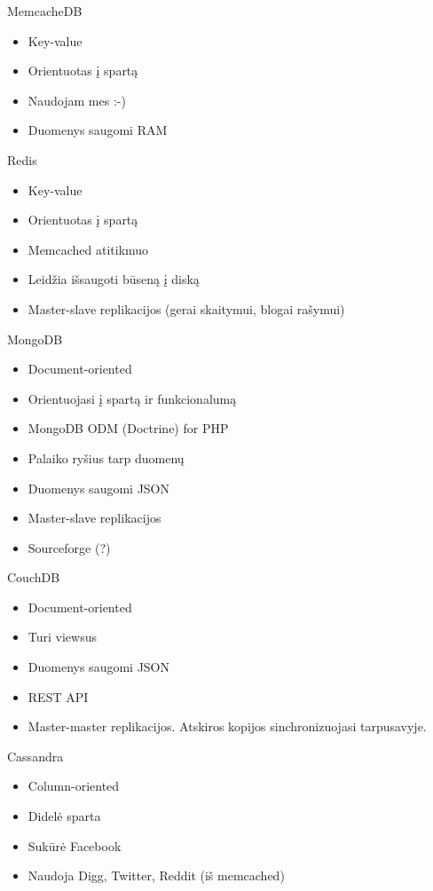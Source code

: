 \documentclass[12pt,a4paper]{beamer}
\begin{document}
\begin{frame}{MemcacheDB}
	\begin{itemize}
	\item Key-value
	\item Orientuotas į spartą
	\item Naudojam mes :-) 
	\item Duomenys saugomi RAM
	\end{itemize}
\end{frame}


\begin{frame}{Redis}
	\begin{itemize}
	\item Key-value
	\item Orientuotas į spartą
	\item Memcached atitikmuo
	\item Leidžia išsaugoti būseną į diską
	\item Master-slave replikacijos (gerai skaitymui, blogai rašymui)
	\end{itemize}
\end{frame}


\begin{frame}{MongoDB}
	\begin{itemize}
	\item Document-oriented
	\item Orientuojasi į spartą ir funkcionalumą
	\item MongoDB ODM (Doctrine) for PHP
	\item Palaiko ryšius tarp duomenų
	\item Duomenys saugomi JSON
	\item Master-slave replikacijos
	\item Sourceforge (?)
	\end{itemize}
\end{frame}


\begin{frame}{CouchDB}
	\begin{itemize}
	\item Document-oriented
	\item Turi viewsus
	\item Duomenys saugomi JSON
	\item REST API
	\item Master-master replikacijos. Atskiros kopijos sinchronizuojasi tarpusavyje.
	\end{itemize}
\end{frame}


\begin{frame}{Cassandra}
	\begin{itemize}
	\item Column-oriented
	\item Didelė sparta
	\item Sukūrė Facebook
	\item Naudoja Digg, Twitter, Reddit (iš memcached)
	\end{itemize}
\end{frame}
\end{document}
